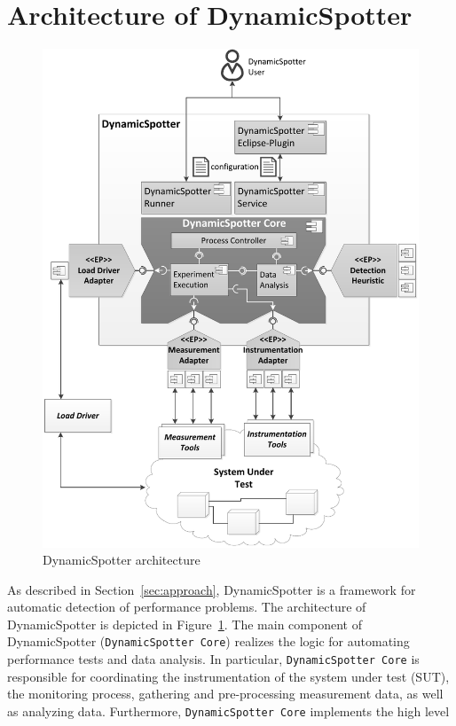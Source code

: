 \documentclass{report}
\newcommand{\DS}{DynamicSpotter }
\begin{document}
\section{Architecture of \DS}
\label{sec:architecture}

\begin{figure}[p]
\includegraphics[width=\textwidth]{figures/architecture.pdf}
\caption{\DS architecture}
\label{fig:architecture}
\end{figure}
As described in Section~\ref{sec:approach}, \DS is a framework for automatic detection of performance problems. The
architecture of \DS is depicted in Figure~\ref{fig:architecture}. The main component of \DS (\texttt{\DS Core}) realizes
the logic for automating performance tests and data analysis. In particular, \texttt{\DS Core} is responsible for
coordinating  the instrumentation of the system under test (SUT), the monitoring process, gathering and
pre-processing measurement data, as well as analyzing data. Furthermore, \texttt{\DS Core} implements the high level
\end{document}
